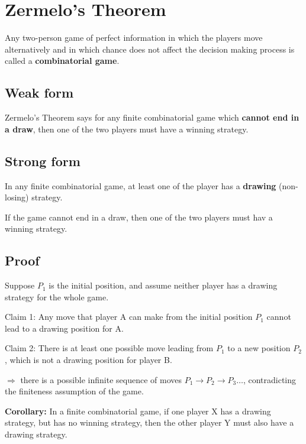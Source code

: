 \documentclass[11pt,a4paper]{article}
\begin{document}
\makenotestitle

\tableofcontents
\newpage
{}

\section{Zermelo's Theorem}
Any two-person game of perfect information in which the players move alternatively and in which chance does not affect the decision making process is called a \textbf{combinatorial game}. \par

\subsection{Weak form}
Zermelo's Theorem says for any finite combinatorial game which \textbf{cannot end in a draw}, then one of the two players must have a winning strategy. \par

\subsection{Strong form}
\par In any finite combinatorial game, at least one of the player has a \textbf{drawing}
(non-losing) strategy. \par
If the game cannot end in a draw, then one of the two players must hav a winning strategy. \par

\subsection{Proof}
Suppose $P_1$ is the initial position, and assume neither player has a drawing strategy for the whole game. \par
Claim 1: Any move that player A can make from the initial position $P_1$ cannot lead to a drawing position for A. \par
Claim 2: There is at least one possible move leading from $P_1$ to a new position $P_2$, which is not a drawing position for player B. \par
$\Rightarrow$ there is a possible infinite sequence of moves $P_1 \rightarrow P_2 \rightarrow P_3 \dots$, contradicting the finiteness assumption of the game. \par

\textbf{Corollary:} In a finite combinatorial game, if one player X has a drawing strategy, but has no winning strategy, then the other player Y must also have a drawing strategy. \par
\end{document}
